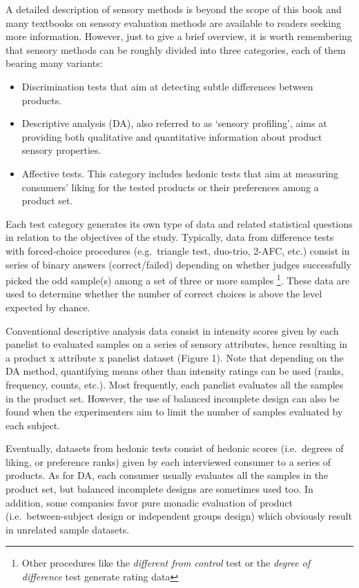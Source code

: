 \documentclass[
]{book}
\providecommand{\tightlist}{%
  \setlength{\itemsep}{0pt}\setlength{\parskip}{0pt}}
\begin{document}
A detailed description of sensory methods is beyond the scope of this book and many textbooks on sensory evaluation methods are available to readers seeking more information. However, just to give a brief overview, it is worth remembering that sensory methods can be roughly divided into three categories, each of them bearing many variants:

\begin{itemize}
\tightlist
\item
  Discrimination tests that aim at detecting subtle differences between products.
\item
  Descriptive analysis (DA), also referred to as `sensory profiling', aims at providing both qualitative and quantitative information about product sensory properties.
\item
  Affective tests. This category includes hedonic tests that aim at measuring consumers' liking for the tested products or their preferences among a product set.
\end{itemize}

Each test category generates its own type of data and related statistical questions in relation to the objectives of the study. Typically, data from difference tests with forced-choice procedures (e.g.~triangle test, duo-trio, 2-AFC, etc.) consist in series of binary answers (correct/failed) depending on whether judges successfully picked the odd sample(s) among a set of three or more samples \footnote{Other procedures like the \emph{different from control} test or the \emph{degree of difference} test generate rating data}. These data are used to determine whether the number of correct choices is above the level expected by chance.

Conventional descriptive analysis data consist in intensity scores given by each panelist to evaluated samples on a series of sensory attributes, hence resulting in a product x attribute x panelist dataset (Figure 1). Note that depending on the DA method, quantifying means other than intensity ratings can be used (ranks, frequency, counts, etc.). Most frequently, each panelist evaluates all the samples in the product set. However, the use of balanced incomplete design can also be found when the experimenters aim to limit the number of samples evaluated by each subject.

Eventually, datasets from hedonic tests consist of hedonic scores (i.e.~degrees of liking, or preference ranks) given by each interviewed consumer to a series of products. As for DA, each consumer usually evaluates all the samples in the product set, but balanced incomplete designs are sometimes used too. In addition, some companies favor pure monadic evaluation of product (i.e.~between-subject design or independent groups design) which obviously result in unrelated sample datasets.
\end{document}
